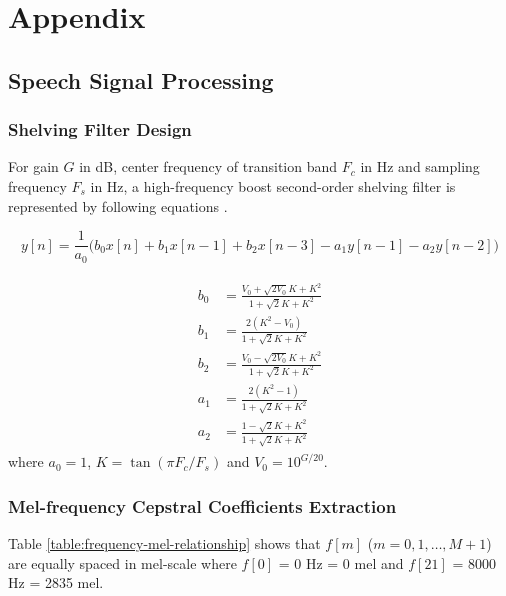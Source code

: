 \appendix
\chapter{Appendix}


\section{Speech Signal Processing}

\subsection{Shelving Filter Design}
\label{shelving-appendix}
For gain $G$ in dB, center frequency of transition band $F_c$ in Hz and sampling frequency $F_s$ in Hz, a high-frequency boost second-order shelving filter is represented by following equations \cite{DAFX_book}.

\begin{equation}
y[n] = \frac{1}{a_0} \Big( b_0 x[n] + b_1 x[n-1] + b_2 x[n-3] - a_1 y[n-1] - a_2 y[n-2] \Big)
\end{equation}

\begin{align}
\begin{split}
b_0 &= \frac{V_0 + \sqrt{2V_0} K + K^2}{1 + \sqrt{2} K + K^2}\\
b_1 &= \frac{2 (K^2 - V_0)}{1 + \sqrt{2} K + K^2}\\
b_2 &= \frac{V_0 - \sqrt{2V_0} K + K^2}{1 + \sqrt{2} K + K^2}\\
a_1 &= \frac{2 (K^2 - 1)}{1 + \sqrt{2} K + K^2}\\
a_2 &= \frac{1 - \sqrt{2}K + K^2}{1 + \sqrt{2}K + K^2}
\end{split}
\end{align}
where $a_0 = 1$, $K = \tan(\pi F_c / F_s)$ and $V_0 = 10^{G/20}$.


\subsection{Mel-frequency Cepstral Coefficients Extraction}

Table \ref{table:frequency-mel-relationship} shows that $f[m]$ ($m = 0, 1, \dots, M+1$) are equally spaced in mel-scale where $f[0]$ = 0 Hz = 0 mel and $f[21]$ = 8000 Hz = 2835 mel.

